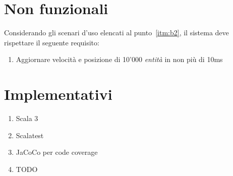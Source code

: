 \section{Non funzionali}\label{sec:non-funzionali}
Considerando gli scenari d'uso elencati al punto~\ref{itm:b2}, il sistema deve rispettare il seguente requisito:
\begin{enumerate}[label=\textbf{\ref{sec:non-funzionali}.\arabic*}]
    \item \label{itm:nf1} Aggiornare velocità e posizione di 10'000 \textit{entità} in non più di 10ms
\end{enumerate}


\section{Implementativi}\label{sec:implementativi}
\begin{enumerate}[label=\textbf{\ref{sec:implementativi}.\arabic*}]
    \item \label{itm:i1} Scala 3
    \item \label{itm:i2} Scalatest
    \item \label{itm:i3} JaCoCo per code coverage
    \item TODO %
\end{enumerate}